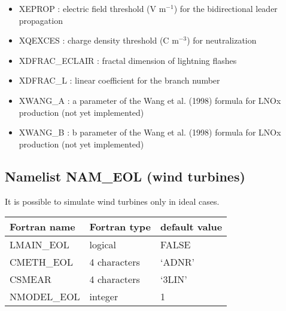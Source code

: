 \begin{itemize}
  \item XEPROP : electric field threshold (V m$^{-1}$) for the bidirectional leader propagation
  \item XQEXCES : charge density threshold (C m$^{-3}$) for neutralization
  \item XDFRAC\_ECLAIR : fractal dimension of lightning flashes
  \item XDFRAC\_L : linear coefficient for the branch number
  \item XWANG\_A : a parameter of the Wang et al. (1998) formula for LNOx production (not yet implemented)
  \item XWANG\_B : b parameter of the Wang et al. (1998) formula for LNOx production (not yet implemented)
\end{itemize}

\subsection{Namelist NAM\_EOL (wind turbines)}
It is possible to simulate wind turbines only in ideal cases. 

\begin{center}
\begin{tabular} {|l|l|l|}
\hline
Fortran name & Fortran type & default value \\
\hline
LMAIN\_EOL      & logical        & FALSE \\
CMETH\_EOL      & 4 characters   & `ADNR' \\
CSMEAR          & 4 characters   & `3LIN' \\
NMODEL\_EOL     & integer        & 1 \\
\hline
\end{tabular}
\end{center}


